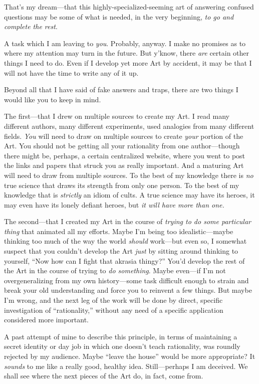 {
 That's my dream---that this
highly-specialized-seeming art of answering confused questions may be
some of what is needed, in the very beginning, \textit{to go and
complete the rest}.}

{
 A task which I am leaving to \textit{you}. Probably, anyway. I
make no promises as to where my attention may turn in the future. But
y'know, there \textit{are} certain other things I need
to do. Even if I develop yet more Art by accident, it may be that I
will not have the time to write any of it up.}

{
 Beyond all that I have said of fake answers and traps, there are
two things I would like you to keep in mind.}

{
 The first---that I drew on multiple sources to create my Art. I
read many different authors, many different experiments, used analogies
from many different fields. \textit{You} will need to draw on multiple
sources to create \textit{your} portion of the Art. You should not be
getting all your rationality from one author---though there might be,
perhaps, a certain centralized website, where you went to post the
links and papers that struck you as really important. And a maturing
Art will need to draw from multiple sources. To the best of my
knowledge there is \textit{no} true science that draws its strength
from only one person. To the best of my knowledge that is
\textit{strictly} an idiom of cults. A true science may have its
heroes, it may even have its lonely defiant heroes, but \textit{it will
have more than one.}}

{
 The second---that I created my Art in the course of \textit{trying
to do some particular thing} that animated all my efforts. Maybe
I'm being too idealistic---maybe thinking too much of
the way the world \textit{should} work---but even so, I somewhat
suspect that you couldn't develop the Art \textit{just}
by sitting around thinking to yourself, ``Now how can
I fight that akrasia thingy?'' You'd
develop the rest of the Art in the course of trying to \textit{do
something}. Maybe even---if I'm not overgeneralizing
from my own history---some task difficult enough to strain and break
your old understanding and force you to reinvent a few things. But
maybe I'm wrong, and the next leg of the work will be
done by direct, specific investigation of
``rationality,'' without any need of
a specific application considered more important.}

{
 A past attempt of mine to describe this principle, in terms of
maintaining a secret identity or day job in which one
doesn't teach rationality, was roundly rejected by my
audience. Maybe ``leave the house''
would be more appropriate? It \textit{sounds} to me like a really good,
healthy idea. Still---perhaps I am deceived. We shall see where the
next pieces of the Art do, in fact, come from.}

